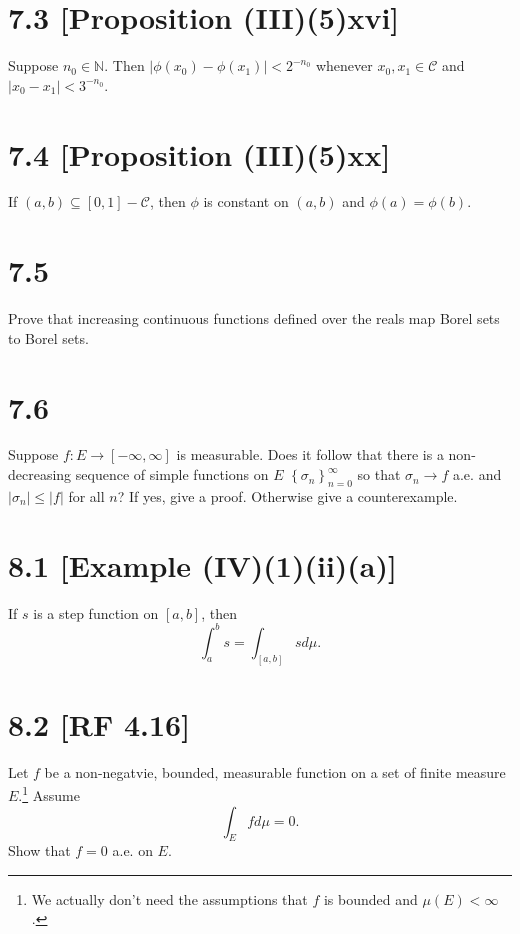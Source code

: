\documentclass[12pt]{article}
\begin{document}
\section*{7.3 [Proposition (III)(5)xvi]}
Suppose $n_{0} \in \mathbb{N}$. Then $|\phi(x_{0}) - \phi(x_{1})| < 2^{-n_{0}}$ whenever $x_{0}, x_{1} \in \mathcal{C}$ and $|x_{0} - x_{1}| < 3^{-n_{0}}$.



\section*{7.4 [Proposition (III)(5)xx]}
If $(a,b) \subseteq [0,1] - \mathcal{C}$, then $\phi$ is constant on $(a,b)$ and $\phi(a) = \phi(b)$.



\section*{7.5}
Prove that increasing continuous functions defined over the reals map Borel sets to Borel sets. 



\section*{7.6}
Suppose $f : E \rightarrow [-\infty, \infty]$ is measurable. Does it follow that there is a non-decreasing sequence of simple functions on $E$
$\left\{ \sigma_{n} \right\}_{n=0}^{\infty}$ so that $\sigma_{n}\rightarrow f$ a.e. and $|\sigma_{n}| \leq |f|$ for all $n$? If yes, give a proof.
Otherwise give a counterexample.



\section*{8.1 [Example (IV)(1)(ii)(a)]}
If $s$ is a step function on $[a,b]$, then 
\[ \int_{a}^{b} s = \int_{[a,b]}sd\mu. \]



\section*{8.2 [RF 4.16]}
Let $f$ be a non-negatvie, bounded, measurable function on a set of finite measure $E$.\footnote{We actually don't need the assumptions that $f$ is
bounded and $\mu(E) < \infty$.} Assume 
\[ \int_{E}fd\mu = 0.\] 
Show that $f = 0$ a.e. on $E$.
\end{document}
